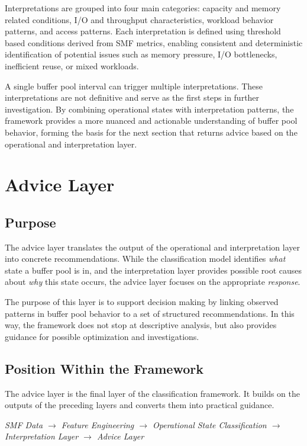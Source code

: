 Interpretations are grouped into four main categories: capacity and memory related conditions, I/O and throughput characteristics, workload behavior patterns, and access patterns. Each interpretation is defined using threshold based conditions derived from SMF metrics, enabling consistent and deterministic identification of potential issues such as memory pressure, I/O bottlenecks, inefficient reuse, or mixed workloads.

A single buffer pool interval can trigger multiple interpretations. These interpretations are not definitive and serve as the first steps in further investigation. By combining operational states with interpretation patterns, the framework provides a more nuanced and actionable understanding of buffer pool behavior, forming the basis for the next section that returns advice based on the operational and interpretation layer.

\section{Advice Layer}


\subsection{Purpose }

The advice layer translates the output of the operational and interpretation layer into concrete recommendations. While the classification model identifies \textit{what} state a buffer pool is in, and the interpretation layer provides possible root causes about \textit{why} this state occurs, the advice layer focuses on the appropriate \textit{response}.

The purpose of this layer is to support decision making by linking observed patterns in buffer pool behavior to a set of structured recommendations. In this way, the framework does not stop at descriptive analysis, but also provides guidance for possible optimization and investigations.

\subsection{Position Within the Framework}

The advice layer is the final layer of the classification framework. It builds on the outputs of the preceding layers and converts them into practical guidance.

\begin{center}
    \textit{SMF Data $\rightarrow$ Feature Engineering $\rightarrow$ Operational State Classification $\rightarrow$ Interpretation Layer $\rightarrow$ Advice Layer}
\end{center}

